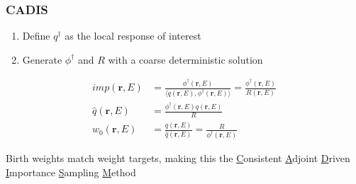 \documentclass[xcolor=x11names,compress]{beamer}
\renewcommand{\(}{\begin{columns}}
\renewcommand{\)}{\end{columns}}
\newcommand{\<}[1]{\begin{column}{#1}}
\renewcommand{\>}{\end{column}}
\newcommand{\ve}[1]{\ensuremath{\mathbf{#1}}}
\begin{document}
\begin{frame}[fragile]
  \frametitle{CADIS}
  
  \begin{enumerate}
  \item Define $q^{\dagger}$ as the local response of interest\\
  \item Generate $\phi^{\dagger}$ and $R$ with a coarse deterministic solution
  \end{enumerate}
% 
\begin{align}
  imp(\ve{r}, E) &= \frac{\phi^{\dagger}(\ve{r}, E)}{\langle q(\ve{r}, E), \phi^{\dagger}(\ve{r}, E) \rangle} = \frac{\phi^{\dagger}(\ve{r}, E)}{R(\ve{r}, E)} \\
  \hat{q}(\ve{r}, E) &= \frac{\phi^{\dagger}(\ve{r}, E) q(\ve{r}, E)}{R} \\
  w_0(\ve{r}, E) &= \frac{q(\ve{r}, E)}{\hat{q}(\ve{r}, E)} = \frac{R}{\phi^{\dagger}(\ve{r}, E)} 
  \label{eq:Importance}
\end{align}

Birth weights match weight targets, making this the \underline{C}onsistent \underline{A}djoint \underline{D}riven \underline{I}mportance \underline{S}ampling \underline{M}ethod

\end{frame}

\end{document}
